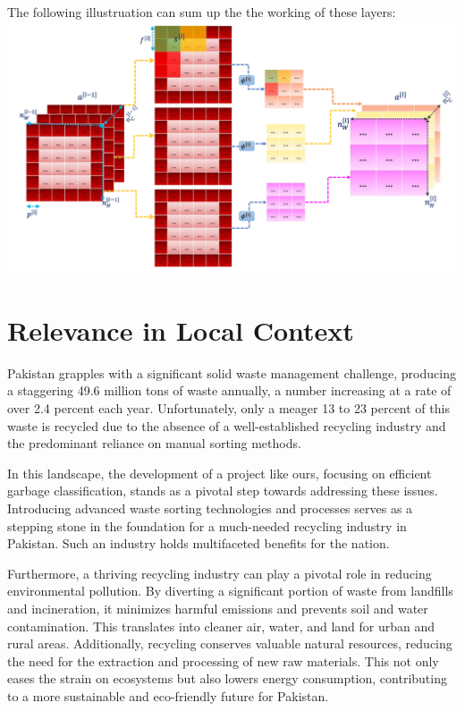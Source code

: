\documentclass{article}
\begin{document}
The following illustruation can sum up the the working of these layers:
\\ \includegraphics[scale = 0.55]{4th.png}    
\section{Relevance in Local Context}

Pakistan grapples with a significant solid waste management challenge, producing a staggering 49.6 million tons of waste annually, a number increasing at a rate of over 2.4 percent each year. Unfortunately, only a meager 13 to 23 percent of this waste is recycled due to the absence of a well-established recycling industry and the predominant reliance on manual sorting methods.

In this landscape, the development of a project like ours, focusing on efficient garbage classification, stands as a pivotal step towards addressing these issues. Introducing advanced waste sorting technologies and processes serves as a stepping stone in the foundation for a much-needed recycling industry in Pakistan. Such an industry holds multifaceted benefits for the nation.

Furthermore, a thriving recycling industry can play a pivotal role in reducing environmental pollution. By diverting a significant portion of waste from landfills and incineration, it minimizes harmful emissions and prevents soil and water contamination. This translates into cleaner air, water, and land for urban and rural areas. Additionally, recycling conserves valuable natural resources, reducing the need for the extraction and processing of new raw materials. This not only eases the strain on ecosystems but also lowers energy consumption, contributing to a more sustainable and eco-friendly future for Pakistan.
\end{document}
